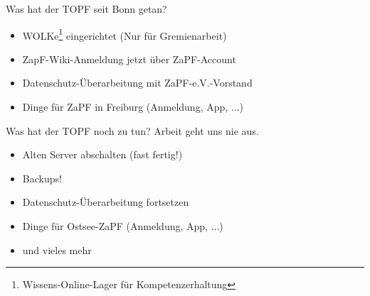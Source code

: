 \documentclass[compress, aspectratio=169]{beamer}
\begin{document}
\pagestyle{empty}
\begin{frame}{Was hat der TOPF seit Bonn getan?}
  \begin{itemize}
    \item WOLKe\footnote{Wissens-Online-Lager für Kompetenzerhaltung} eingerichtet (Nur für Gremienarbeit)
    \item ZapF-Wiki-Anmeldung jetzt über ZaPF-Account
    \item Datenschutz-Überarbeitung mit ZaPF-e.V.-Vorstand
    \item Dinge für ZaPF in Freiburg (Anmeldung, App, ...)
  \end{itemize}
\end{frame}

\pagestyle{empty}
\begin{frame}{Was hat der TOPF noch zu tun?}
  Arbeit geht uns nie aus.
  \begin{itemize}
    \item Alten Server abschalten (fast fertig!)
    \item Backups!
    \item Datenschutz-Überarbeitung fortsetzen
    \item Dinge für Ostsee-ZaPF (Anmeldung, App, ...)
    \item und vieles mehr
  \end{itemize}
\end{frame}
\end{document}
